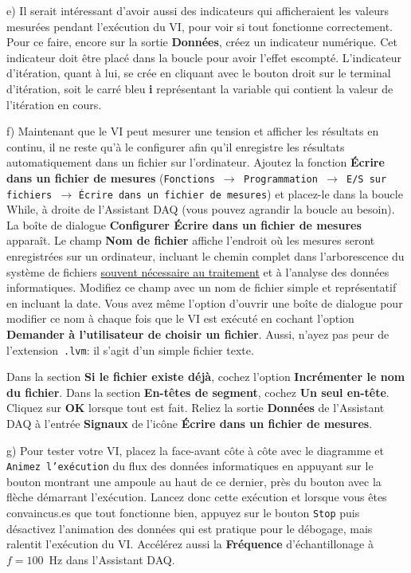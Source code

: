 \documentclass[canadien,12pt,oneside,letterpaper]{article}
\begin{document}
e) Il serait intéressant d'avoir aussi des indicateurs qui afficheraient les valeurs mesurées pendant l'exécution du VI, pour voir si tout fonctionne correctement. Pour ce faire, encore sur la sortie \textbf{Données}, créez un indicateur numérique. Cet indicateur doit être placé dans la boucle pour avoir l'effet escompté. L'indicateur d'itération, quant à lui, se crée en cliquant avec le bouton droit sur le terminal d'itération, soit le carré bleu \textbf{i} représentant la variable qui contient la valeur de l'itération en cours.

f) Maintenant que le VI peut mesurer une tension et afficher les résultats en continu, il ne reste qu'à le configurer afin qu'il enregistre les résultats automatiquement dans un fichier sur l'ordinateur. Ajoutez la fonction \textbf{Écrire dans un fichier de mesures} (\texttt{Fonctions $\rightarrow$ Programmation $\rightarrow$ E/S sur fichiers $\rightarrow$} \texttt{Écrire dans un fichier de mesures}) et placez-le dans la boucle While, à droite de l'Assistant DAQ (vous pouvez agrandir la boucle au besoin). La boîte de dialogue \textbf{Configurer Écrire dans un fichier de mesures} apparaît. Le champ \textbf{Nom de fichier} affiche l'endroit où les mesures seront enregistrées sur un ordinateur, incluant le chemin complet dans l'arborescence du système de fichiers \href{https://docs.python.org/3/library/pathlib.html}{souvent nécessaire au traitement} et à l'analyse des données informatiques. Modifiez ce champ avec un nom de fichier simple et représentatif en incluant la date. Vous avez même l'option d'ouvrir une boîte de dialogue pour modifier ce nom à chaque fois que le VI est exécuté en cochant l'option \textbf{Demander à l'utilisateur de choisir un fichier}. Aussi, n'ayez pas peur de l'extension~\texttt{.lvm}: il s'agit d'un simple fichier texte.

Dans la section \textbf{Si le fichier existe déjà}, cochez l'option \textbf{Incrémenter le nom du fichier}. Dans la section \textbf{En-têtes de segment}, cochez \textbf{Un seul en-tête}. Cliquez sur \textbf{OK} lorsque tout est fait. Reliez la sortie \textbf{Données} de l'Assistant DAQ à l'entrée \textbf{Signaux} de l'icône \textbf{Écrire dans un fichier de mesures}.

g) Pour tester votre VI, placez la face-avant côte à côte avec le diagramme et \texttt{Animez l'exécution} du flux des données informatiques en appuyant sur le bouton montrant une ampoule au haut de ce dernier, près du bouton avec la flèche démarrant l'exécution. Lancez donc cette exécution et lorsque vous êtes convaincus.es que tout fonctionne bien, appuyez sur le bouton \texttt{Stop} puis désactivez l'animation des données qui est pratique pour le débogage, mais ralentit l'exécution du VI. Accélérez aussi la \textbf{Fréquence} d'échantillonage à $f=100$~Hz dans l'Assistant DAQ.
\end{document}
